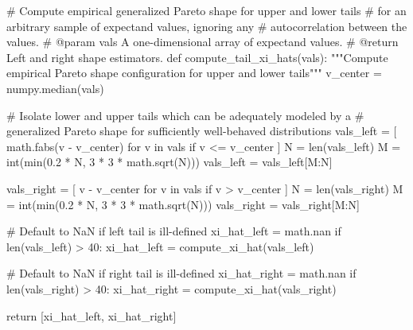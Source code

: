 \documentclass[
  letterpaper,
  DIV=11,
  numbers=noendperiod]{scrartcl}
\newenvironment{Shaded}{\begin{snugshade}}{\end{snugshade}}
\newcommand{\BuiltInTok}[1]{\textcolor[rgb]{0.00,0.23,0.31}{#1}}
\newcommand{\CommentTok}[1]{\textcolor[rgb]{0.37,0.37,0.37}{#1}}
\newcommand{\ControlFlowTok}[1]{\textcolor[rgb]{0.00,0.23,0.31}{#1}}
\newcommand{\DecValTok}[1]{\textcolor[rgb]{0.68,0.00,0.00}{#1}}
\newcommand{\FloatTok}[1]{\textcolor[rgb]{0.68,0.00,0.00}{#1}}
\newcommand{\KeywordTok}[1]{\textcolor[rgb]{0.00,0.23,0.31}{#1}}
\newcommand{\NormalTok}[1]{\textcolor[rgb]{0.00,0.23,0.31}{#1}}
\newcommand{\OperatorTok}[1]{\textcolor[rgb]{0.37,0.37,0.37}{#1}}
\begin{document}
\begin{Shaded}
\begin{Highlighting}[]
\CommentTok{\# Compute empirical generalized Pareto shape for upper and lower tails}
\CommentTok{\# for an arbitrary sample of expectand values, ignoring any}
\CommentTok{\# autocorrelation between the values.}
\CommentTok{\# @param vals A one{-}dimensional array of expectand values.}
\CommentTok{\# @return Left and right shape estimators.}
\KeywordTok{def}\NormalTok{ compute\_tail\_xi\_hats(vals):}
  \CommentTok{"""Compute empirical Pareto shape configuration for upper and lower tails"""}
\NormalTok{  v\_center }\OperatorTok{=}\NormalTok{ numpy.median(vals)}
  
  \CommentTok{\# Isolate lower and upper tails which can be adequately modeled by a }
  \CommentTok{\# generalized Pareto shape for sufficiently well{-}behaved distributions}
\NormalTok{  vals\_left }\OperatorTok{=}\NormalTok{ [ math.fabs(v }\OperatorTok{{-}}\NormalTok{ v\_center) }\ControlFlowTok{for}\NormalTok{ v }\KeywordTok{in}\NormalTok{ vals }\ControlFlowTok{if}\NormalTok{ v }\OperatorTok{\textless{}=}\NormalTok{ v\_center ]}
\NormalTok{  N }\OperatorTok{=} \BuiltInTok{len}\NormalTok{(vals\_left)}
\NormalTok{  M }\OperatorTok{=} \BuiltInTok{int}\NormalTok{(}\BuiltInTok{min}\NormalTok{(}\FloatTok{0.2} \OperatorTok{*}\NormalTok{ N, }\DecValTok{3} \OperatorTok{*} \DecValTok{3} \OperatorTok{*}\NormalTok{ math.sqrt(N)))}
\NormalTok{  vals\_left }\OperatorTok{=}\NormalTok{ vals\_left[M:N]}
  
\NormalTok{  vals\_right }\OperatorTok{=}\NormalTok{ [ v }\OperatorTok{{-}}\NormalTok{ v\_center }\ControlFlowTok{for}\NormalTok{ v }\KeywordTok{in}\NormalTok{ vals }\ControlFlowTok{if}\NormalTok{ v }\OperatorTok{\textgreater{}}\NormalTok{ v\_center ]}
\NormalTok{  N }\OperatorTok{=} \BuiltInTok{len}\NormalTok{(vals\_right)}
\NormalTok{  M }\OperatorTok{=} \BuiltInTok{int}\NormalTok{(}\BuiltInTok{min}\NormalTok{(}\FloatTok{0.2} \OperatorTok{*}\NormalTok{ N, }\DecValTok{3} \OperatorTok{*} \DecValTok{3} \OperatorTok{*}\NormalTok{ math.sqrt(N)))}
\NormalTok{  vals\_right }\OperatorTok{=}\NormalTok{ vals\_right[M:N]}
  
  \CommentTok{\# Default to NaN if left tail is ill{-}defined}
\NormalTok{  xi\_hat\_left }\OperatorTok{=}\NormalTok{ math.nan}
  \ControlFlowTok{if} \BuiltInTok{len}\NormalTok{(vals\_left) }\OperatorTok{\textgreater{}} \DecValTok{40}\NormalTok{:}
\NormalTok{    xi\_hat\_left }\OperatorTok{=}\NormalTok{ compute\_xi\_hat(vals\_left)}
  
  \CommentTok{\# Default to NaN if right tail is ill{-}defined}
\NormalTok{  xi\_hat\_right }\OperatorTok{=}\NormalTok{ math.nan}
  \ControlFlowTok{if} \BuiltInTok{len}\NormalTok{(vals\_right) }\OperatorTok{\textgreater{}} \DecValTok{40}\NormalTok{:}
\NormalTok{    xi\_hat\_right }\OperatorTok{=}\NormalTok{ compute\_xi\_hat(vals\_right)}
    
  \ControlFlowTok{return}\NormalTok{ [xi\_hat\_left, xi\_hat\_right]}
\end{Highlighting}
\end{Shaded}
\end{document}
